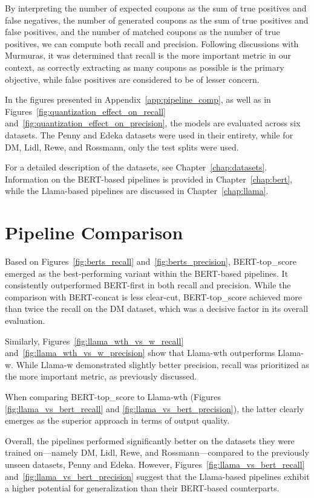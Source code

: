 \documentclass[licencjacka,en]{pracamgr}
\begin{document}
By interpreting the number of expected coupons as the sum of true positives and false negatives, the number of generated coupons as the sum of true positives and false positives, and the number of matched coupons as the number of true positives, we can compute both recall and precision. Following discussions with Murmuras, it was determined that recall is the more important metric in our context, as correctly extracting as many coupons as possible is the primary objective, while false positives are considered to be of lesser concern.

In the figures presented in Appendix~\ref{app:pipeline_comp}, as well as in Figures~\ref{fig:quantization_effect_on_recall} and~\ref{fig:quantization_effect_on_precision}, the models are evaluated across six datasets. The Penny and Edeka datasets were used in their entirety, while for DM, Lidl, Rewe, and Rossmann, only the test splits were used.

For a detailed description of the datasets, see Chapter~\ref{chap:datasets}. Information on the BERT-based pipelines is provided in Chapter~\ref{chap:bert}, while the Llama-based pipelines are discussed in Chapter~\ref{chap:llama}.

\section{Pipeline Comparison}

Based on Figures~\ref{fig:berts_recall} and~\ref{fig:berts_precision}, BERT-top\_score emerged as the best-performing variant within the BERT-based pipelines. It consistently outperformed BERT-first in both recall and precision. While the comparison with BERT-concat is less clear-cut, BERT-top\_score achieved more than twice the recall on the DM dataset, which was a decisive factor in its overall evaluation. 

Similarly, Figures~\ref{fig:llama_wth_vs_w_recall} and~\ref{fig:llama_wth_vs_w_precision} show that Llama-wth outperforms Llama-w. While Llama-w demonstrated slightly better precision, recall was prioritized as the more important metric, as previously discussed. 

When comparing BERT-top\_score to Llama-wth (Figures \ref{fig:llama_vs_bert_recall} and \ref{fig:llama_vs_bert_precision}), the latter clearly emerges as the superior approach in terms of output quality.

Overall, the pipelines performed significantly better on the datasets they were trained on—namely DM, Lidl, Rewe, and Rossmann—compared to the previously unseen datasets, Penny and Edeka. However, Figures~\ref{fig:llama_vs_bert_recall} and~\ref{fig:llama_vs_bert_precision} suggest that the Llama-based pipelines exhibit a higher potential for generalization than their BERT-based counterparts.
\end{document}
